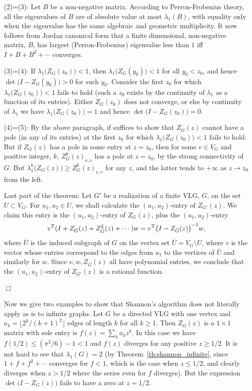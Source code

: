 \documentclass[12pt]{article}
\newcommand{\proofbox}{\begin{flushright}$\Box$\end{flushright}}
\begin{document}
(2)=(3): 
Let $B$ be a non-negative matrix.  According to Perron-Frobenius theory,
all the eigenvalues of $B$ are of absolute value at most $\lambda_1(B)$,
with equality only when the eigenvalue has the same algebraic and geometric
multiplicity.
It now follows from Jordan canonical
form that
a finite dimensional, non-negative matrix, $B$, has largest
(Perron-Frobenius) eigenvalue less than $1$ iff $I+B+B^2+\cdots$ converges.

(3)=(4): If $\lambda_1\bigl(Z_G(z_0)\bigr)<1$, then 
$\lambda_1\bigl(Z_G(y_0)\bigr)<1$ for all $y_0<z_0$, and hence
$\det\bigl(I-Z_G(y_0)\bigr)>0$ for such $y_0$.  Consider the first
$z_0$ for which $\lambda_1\bigl(Z_G(z_0)\bigr)<1$ fails to hold
(such a $z_0$ exists by the continuity of $\lambda_1$ as a function of
its entries).  Either $Z_G(z_0)$ does not converge, or else by continuity
of $\lambda_1$ we have $\lambda_1\bigl(Z_G(z_0)\bigr)=1$ and hence
$\det\bigl(I-Z_G(z_0)\bigr)=0$.

(4)=(5): By the above paragraph, if suffices to show that
$Z_G(z)$ cannot have a pole (in any of its entries)
at the first $z_0$ for which
$\lambda_1\bigl(Z_G(z_0)\bigr)<1$ fails to hold.  But if $Z_G(z)$ has a
pole in some entry at $z=z_0$, then for some $v\in V_G$ and positive
integer, $k$, $Z^k_G(z)_{v,v}$ has a pole at $z=z_0$, by the strong
connectivity of $G$.  But $\lambda_1^k\bigl( Z_G(z) \bigr)\ge
Z^k_G(z)_{v,v}$ for any $z$, and the latter tends to $+\infty$ as
$z\to z_0$ from the left.

Last part of the theorem:
Let $G'$ be a realization of a finite VLG, $G$, on the set $U\subset V_G$.
For $u_1,u_2\in U$, we shall calculate the $(u_1,u_2)$-entry of $Z_{G'}(z)$.
We claim this entry is the $(u_1,u_2)$-entry of $Z_{G}(z)$, plus the
$(u_1,u_2)$-entry
$$
v^{\rm T} (I+Z_{\bar G}(z)+Z_{\bar G}^2(z)+\cdots) w = v^{\rm T} 
\bigl(I-Z_{\bar G}(z)\bigr)^{-1}w,
$$
where $\bar U$ is the induced subgraph of $G$ on the vertex set
$\bar U=V_G\setminus U$, where $v$ is the vector whose entries correspond
to the edges from $u_1$ to the vertices of $\bar U$ and similarly for
$w$.  Since $v,w,Z_{\bar G}(z)$ all have polynomial entries,
we conclude that the $(u_1,u_2)$-entry of $Z_{G'}(z)$ is a rational
function.
\proofbox

Now we give two examples to show that Shannon's algorithm does not
literally apply as is to infinite graphs.  Let $G$ be a directed VLG with
one vertex and $a_k=\lfloor 2^k / (k+1)^2 \rfloor$ edges of length $k$
for all $k\ge 1$.
Then $Z_G(z)$ is a $1\times 1$ matrix with sole entry is
$f(z)=\sum_k a_k z^k$.  In this case we have $f(1/2)\le (\pi^2/6)-1<1$
and $f(z)$ diverges for any positive $z\ge 1/2$.  
It is not hard to see that $\lambda_1(G)=2$ (by
Theorem~\ref{th:shannon_infinite}, 
since $1+f+f^2+\cdots$ converges for $f<1$, which is the case
when $z\le 1/2$, and clearly diverges when $z>1/2$ where the series even
for $f$ diverges).
But the expression $\det\bigl(I-Z_G(z)\bigr)$ fails to have a zero at
$z=1/2$.
\end{document}
